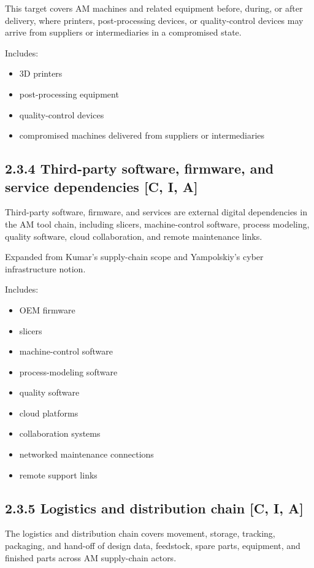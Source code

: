 \documentclass[10pt,a4paper,oneside]{report}
\begin{document}
This target covers AM machines and related equipment before, during, or after delivery, where printers, post-processing devices, or quality-control devices may arrive from suppliers or intermediaries in a compromised state.

Includes:

\begin{itemize}
\item 3D printers
\item post-processing equipment
\item quality-control devices
\item compromised machines delivered from suppliers or intermediaries
\end{itemize}


\subsection{2.3.4 Third-party software, firmware, and service dependencies [C, I, A]}


Third-party software, firmware, and services are external digital dependencies in the AM tool chain, including slicers, machine-control software, process modeling, quality software, cloud collaboration, and remote maintenance links.

Expanded from Kumar's supply-chain scope and Yampolskiy's cyber infrastructure notion.

Includes:

\begin{itemize}
\item OEM firmware
\item slicers
\item machine-control software
\item process-modeling software
\item quality software
\item cloud platforms
\item collaboration systems
\item networked maintenance connections
\item remote support links
\end{itemize}


\subsection{2.3.5 Logistics and distribution chain [C, I, A]}


The logistics and distribution chain covers movement, storage, tracking, packaging, and hand-off of design data, feedstock, spare parts, equipment, and finished parts across AM supply-chain actors.
\end{document}
